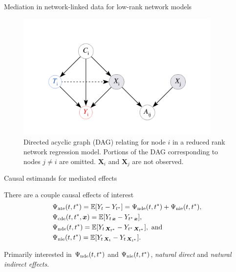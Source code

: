 \documentclass{beamer}
\theoremstyle{remark}
\newcommand{\x}{\bm x}
\newcommand{\X}{\bm X}
\newcommand{\ate}{\Psi_\text{ate} \paren*{t, t^*}}
\newcommand{\cde}{\Psi_\text{cde} \paren*{t, t^*, \x}}
\newcommand{\nde}{\Psi_\text{nde} \paren*{t, t^*}}
\newcommand{\nie}{\Psi_\text{nie} \paren*{t, t^*}}
\DeclarePairedDelimiter{\paren}{(}{)}
\DeclarePairedDelimiter{\brac}{[}{]}
\newcommand{\E}[2][]{%
   \ifthenelse{ \equal{#1}{} }
      {\ensuremath{\mathbb{E} \brac*{#2}}}
      {\ensuremath{\mathbb{E} \brac*{#2 \mid #1}}}
}
\begin{document}
\begin{frame}{Mediation in network-linked data for low-rank network models}

    \centering

    \begin{figure}
        \includegraphics[width=0.9\textwidth]{figures/mediating.png}
        \caption{Directed acyclic graph (DAG) relating for node $i$ in a reduced rank network regression model. Portions of the DAG corresponding to nodes $j \neq i$ are omitted. $\X_i$ and $\X_j$ are not observed.}
        \label{fig:mediating}
    \end{figure}

\end{frame}

\begin{frame}{Causal estimands for mediated effects}

    There are a couple causal effects of interest
    \begin{align*}
         & \ate = \E{Y_t - Y_{t^*}} = \nde + \nie,                          \\
         & \cde = \E{Y_{t \, \x} - Y_{t^* \, \x}},                          \\
         & \nde = \E{Y_{t \, \X_{t^*}} - Y_{t^* \, \X_{t^*}}}, \text{ and } \\
         & \nie = \E{Y_{t \, \X_{t}} - Y_{t \, \X_{t^*}}}.
    \end{align*}

    Primarily interested in $\nde$ and $\nie$, \emph{natural direct} and \emph{natural indirect effects}.

\end{frame}
\end{document}
